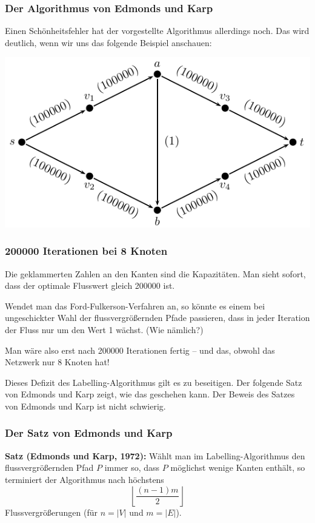 \documentclass[smaller]{beamer}
\begin{document}
\begin{frame}
 \frametitle{Der Algorithmus von Edmonds und Karp}
 Einen \alert{Schönheitsfehler} hat der vorgestellte Algorithmus allerdings noch. Das wird deutlich, wenn wir uns das folgende Beispiel anschauen:
 \begin{center}
  \includegraphics{fig21.pdf}
 \end{center}

\end{frame}

\begin{frame}
 \frametitle{200000 Iterationen bei 8 Knoten}
 Die geklammerten Zahlen an den Kanten sind die Kapazitäten. Man sieht sofort, dass der \alert{optimale Flusswert gleich 200000} ist. \\ \vspace*{0.2cm}

Wendet man das Ford-Fulkerson-Verfahren an, so könnte es einem bei ungeschickter Wahl der flussvergrößernden Pfade passieren, dass in jeder Iteration der Fluss nur um den Wert 1 wächst. (Wie nämlich?) \\ \vspace*{0.2cm}

\alert{Man wäre also erst nach 200000 Iterationen fertig} -- und das, obwohl das Netzwerk nur 8 Knoten hat! \\ \vspace*{0.2cm}

Dieses Defizit des Labelling-Algorithmus gilt es zu beseitigen. Der folgende Satz von Edmonds und Karp zeigt, wie das geschehen kann. Der Beweis des Satzes von Edmonds und Karp ist nicht schwierig. %
\end{frame}

\begin{frame}
 \frametitle{Der Satz von Edmonds und Karp}
 \textbf{Satz (Edmonds und Karp, 1972):}
Wählt man im Labelling-Algorithmus den flussvergrößernden Pfad $P$ immer so, dass $P$ \alert{möglichst wenige Kanten} enthält, so terminiert der Algorithmus nach höchstens
\[
\left\lfloor \frac{(n-1)m}{2} \right\rfloor
\]
Flussvergrößerungen (für $n = |V|$ und $m = |E|$). 
\end{frame}
\end{document}
